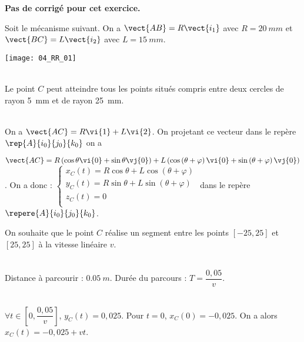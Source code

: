 \normaltrue
\correctionfalse


\setcounter{numques}{0}
\ifcorrection
\else
\textbf{Pas de corrigé pour cet exercice.}
\fi

\ifprof
\else
Soit le mécanisme suivant. On a $\vect{AB}=R\vect{i_1}$ avec $R=\SI{20}{mm}$ et  
$\vect{BC}=L\vect{i_2}$ avec $L=\SI{15}{mm}$.
\begin{center}
\texttt{[image: 04\_RR\_01]}
\end{center}
\fi

\ifprof~\\
Le point $C$ peut atteindre tous les points situés compris entre deux cercles de rayon \SI{5}{mm} et de rayon \SI{25}{mm}.
\else
\fi

\ifprof~\\
On  a $\vect{AC}=R\vi{1}+L\vi{2}$. On projetant ce vecteur dans le repère $\rep{A}{i_0}{j_0}{k_0}$ on a 

$\vect{AC}=R\left(\cos\theta \vi{0} + \sin\theta \vj{0}\right) +L\left(\cos\left(\theta+\varphi\right) \vi{0} + \sin\left(\theta+\varphi\right) \vj{0}\right)$. On a donc :
$\left\{
\begin{array}{l}
x_C(t)= R\cos\theta  +L\cos\left(\theta+\varphi\right)  \\
y_C(t)= R \sin\theta + L\sin\left(\theta+\varphi\right)\\
z_C(t)= 0\\
\end{array}
\right.
$ dans le repère $\repere{A}{i_0}{j_0}{k_0}$.
\else
\fi

\ifprof
\else
On souhaite que le point $C$ réalise un segment entre les points $[-25,25]$ et $[25,25]$ à la vitesse linéaire $v$. 
\fi


\ifprof ~\\
Distance à parcourir : $\SI{0,05}{m}$. Durée du parcours : $T=\dfrac{0,05}{v}$.
\else
\fi


\ifprof ~\\
$\forall t \in \left[0,\dfrac{0,05}{v}\right]$, $y_C(t)=0,025$. 
Pour $t=0$, $x_C(0)=-0,025$. On a alors $x_C(t)=-0,025+vt$.  

